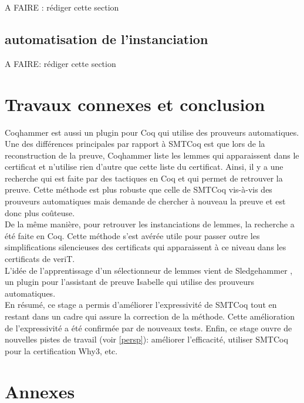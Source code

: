 \documentclass[11pt]{article}
\begin{document}
A FAIRE : rédiger cette section


\subsection{automatisation de l'instanciation}

A FAIRE: rédiger cette section


\section{Travaux connexes et conclusion}

Coqhammer \cite{coqhammer} est aussi un plugin pour Coq qui utilise des prouveurs automatiques. Une des différences principales par rapport à SMTCoq est que lors de la reconstruction de la preuve, Coqhammer liste les lemmes qui apparaissent dans le certificat et n'utilise rien d'autre que cette liste du certificat. Ainsi, il y a une recherche qui est faite par des tactiques en Coq et qui permet de retrouver la preuve. Cette méthode est plus robuste que celle  de SMTCoq vis-à-vis des prouveurs automatiques mais demande de chercher à nouveau la preuve et est donc plus coûteuse. \\
De la même manière, pour retrouver les instanciations de lemmes, la recherche a été faite en Coq. Cette méthode s'est avérée utile pour passer outre les simplifications silencieuses des certificats qui apparaissent à ce niveau dans les certificats de veriT. \\
L'idée de l'apprentissage d'un sélectionneur de lemmes vient de Sledgehammer \cite{sledgehammer_manual}, un plugin pour l'assistant de preuve Isabelle qui utilise des prouveurs automatiques. \\

En résumé, ce stage a permis d'améliorer l'expressivité de SMTCoq tout en restant dans un cadre qui assure la correction de la méthode. Cette amélioration de l'expressivité a été confirmée par de nouveaux tests. Enfin, ce stage ouvre de nouvelles pistes de travail (voir \ref{persp}): améliorer l'efficacité, utiliser SMTCoq pour la certification Why3, etc.



\renewcommand\refname{Bibliographie}
\nocite{*}
{}


\newpage
\pagestyle{empty}

\section{Annexes}
\end{document}
